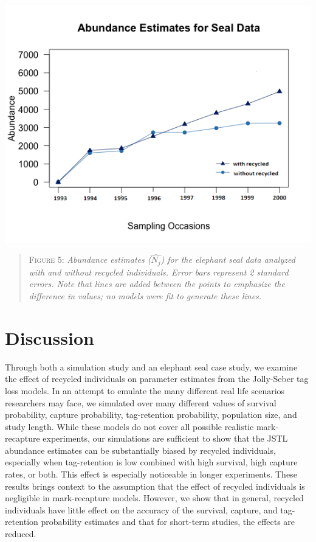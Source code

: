 \documentclass[]{article}
\begin{document}
\includegraphics{RecycledPaper_files/figure-latex/Seals_Abundance.png}

\begin{quote}
\textsc{Figure 5:}
\textsl{Abundance estimates ($\hat{N_j}$) for the elephant seal data analyzed with and without recycled individuals. Error bars represent 2 standard errors.  Note that lines are added between the points to emphasize the difference in values; no models were fit to generate these lines.}
\end{quote}

\section{Discussion}\label{discussion}
Through both a simulation study and an elephant seal case study, we examine the effect of recycled individuals on parameter estimates from the Jolly-Seber tag loss models.
In an attempt to emulate the many different real life scenarios
researchers may face, we simulated over many different values of
survival probability, capture probability, tag-retention probability, population size, and study length. While
these models do not cover all possible realistic mark-recapture
experiments, our simulations are sufficient to show that the JSTL
abundance estimates can be substantially biased by recycled individuals,
especially when tag-retention is low combined with high survival, high
capture rates, or both. This effect is especially noticeable in longer
experiments. These results brings context to the assumption that the effect of
recycled individuals is negligible in mark-recapture models. However, we
show that in general, recycled individuals have little effect on the
accuracy of the survival, capture, and tag-retention probability
estimates and that for short-term studies, the effects are reduced.
\end{document}
